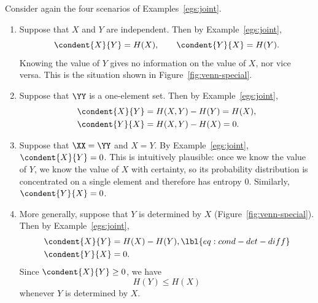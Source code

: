 \begin{examples}
Consider again the four scenarios of Examples~\ref{egs:joint}.
% 
\begin{enumerate}
\item
{}
Suppose that $X$ and $Y$ are independent.  Then by
Example~\ref{egs:joint}, 
\[
\condent{X}{Y} = H(X),
\qquad
\condent{Y}{X} = H(Y).
\]
Knowing the value of $Y$ gives no information on the value of $X$, nor vice
versa.  This is the situation shown in
Figure~\ref{fig:venn-special}.

\item 
{}
Suppose that $\YY$ is a one-element set.  Then by
Example~\ref{egs:joint}, 
% 
\begin{align*}
\condent{X}{Y}  &
=
H(X, Y) - H(Y) = H(X),  \\
\condent{Y}{X}  &
=
H(X, Y) - H(X) = 0.
\end{align*}

\item
{}
Suppose that $\XX = \YY$ and $X = Y$.  By
Example~\ref{egs:joint}, $\condent{X}{Y} = 0$.  This
is intuitively plausible: once we know the value of $Y$, we know the value
of $X$ with certainty, so its probability distribution is concentrated on a
single element and therefore has entropy $0$.  Similarly, $\condent{Y}{X} =
0$.

\item
{}
More generally, suppose that $Y$ is determined by $X$
(Figure~\ref{fig:venn-special}).  Then by
Example~\ref{egs:joint},
% 
\begin{align}
\condent{X}{Y}  & 
= 
H(X) - H(Y),
\lbl{eq:cond-det-diff}        \\
\condent{Y}{X}  &
=
0.
\nonumber
\end{align}
% 
Since $\condent{X}{Y} \geq 0$, we have
\[
H(Y) \leq H(X)
\]
whenever $Y$ is determined by $X$.
\end{enumerate}
\end{examples}

